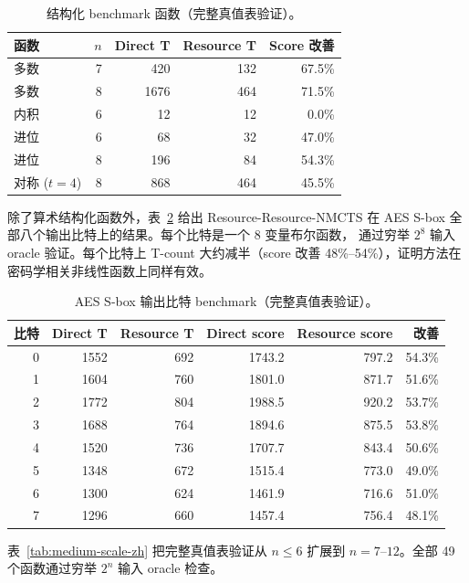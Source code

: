 \documentclass[UTF8,fontset=fandol,11pt]{ctexart}
\newcommand{\method}{Resource-NMCTS}
\begin{document}
\begin{table}[H]
\centering\small
\caption{结构化 benchmark 函数（完整真值表验证）。}
\label{tab:structured-benchmark-zh}
\begin{tabular}{lrrrr}\toprule
函数 & $n$ & Direct T & Resource T & Score 改善 \\ \midrule
多数 & 7 & 420 & 132 & 67.5\% \\
多数 & 8 & 1676 & 464 & 71.5\% \\
内积 & 6 & 12 & 12 & 0.0\% \\
进位 & 6 & 68 & 32 & 47.0\% \\
进位 & 8 & 196 & 84 & 54.3\% \\
对称 ($t{=}4$) & 8 & 868 & 464 & 45.5\% \\ \bottomrule
\end{tabular}\end{table}

除了算术结构化函数外，表~\ref{tab:aes-sbox-zh} 给出 Resource-\method{}
在 AES S-box 全部八个输出比特上的结果。每个比特是一个 8 变量布尔函数，
通过穷举 $2^8$ 输入 oracle 验证。每个比特上 T-count 大约减半（score 改善
48\%--54\%），证明方法在密码学相关非线性函数上同样有效。

\begin{table}[H]
\centering\small
\caption{AES S-box 输出比特 benchmark（完整真值表验证）。}
\label{tab:aes-sbox-zh}
\begin{tabular}{rrrrrr}
\toprule
比特 & Direct T & Resource T & Direct score & Resource score & 改善 \\
\midrule
0 & 1552 & 692 & 1743.2 & 797.2 & 54.3\% \\
1 & 1604 & 760 & 1801.0 & 871.7 & 51.6\% \\
2 & 1772 & 804 & 1988.5 & 920.2 & 53.7\% \\
3 & 1688 & 764 & 1894.6 & 875.5 & 53.8\% \\
4 & 1520 & 736 & 1707.7 & 843.4 & 50.6\% \\
5 & 1348 & 672 & 1515.4 & 773.0 & 49.0\% \\
6 & 1300 & 624 & 1461.9 & 716.6 & 51.0\% \\
7 & 1296 & 660 & 1457.4 & 756.4 & 48.1\% \\
\bottomrule
\end{tabular}
\end{table}

表~\ref{tab:medium-scale-zh} 把完整真值表验证从 $n\leq6$ 扩展到
$n=7$--$12$。全部 49 个函数通过穷举 $2^n$ 输入 oracle 检查。
\end{document}
